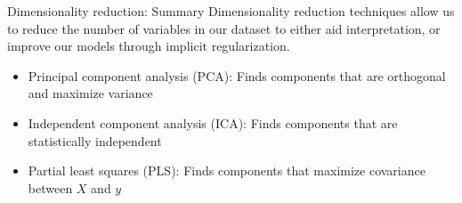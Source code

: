 \begin{frame}{Dimensionality reduction: Summary}
    Dimensionality reduction techniques allow us to reduce the number of variables in our dataset to either aid interpretation, or improve our models through implicit regularization.
    \begin{itemize}
        \item Principal component analysis (PCA): Finds components that are orthogonal and maximize variance
        \item Independent component analysis (ICA): Finds components that are statistically independent
        \item Partial least squares (PLS): Finds components that maximize covariance between $X$ and $y$
    \end{itemize}
\end{frame}
